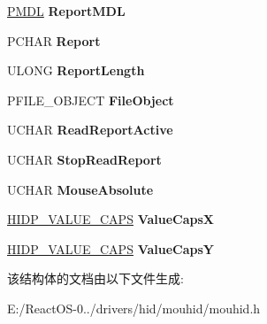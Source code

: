 \begin{DoxyCompactItemize}
\hyperlink{interfacevoid}{P\+M\+DL} {\bfseries Report\+M\+DL}
\item 
\mbox{\label{struct_m_o_u_h_i_d___d_e_v_i_c_e___e_x_t_e_n_s_i_o_n_ac40076c045a108e6a130cf6f31b1173a}} 
P\+C\+H\+AR {\bfseries Report}
\item 
\mbox{\label{struct_m_o_u_h_i_d___d_e_v_i_c_e___e_x_t_e_n_s_i_o_n_a8f4f640d72b6320b365d1a3a17cded89}} 
U\+L\+O\+NG {\bfseries Report\+Length}
\item 
\mbox{\label{struct_m_o_u_h_i_d___d_e_v_i_c_e___e_x_t_e_n_s_i_o_n_a71c0cf27dc09797198cd045c988089b4}} 
P\+F\+I\+L\+E\+\_\+\+O\+B\+J\+E\+CT {\bfseries File\+Object}
\item 
\mbox{\label{struct_m_o_u_h_i_d___d_e_v_i_c_e___e_x_t_e_n_s_i_o_n_a79579fc9f14d2bfc7ebc33baa6bd97d5}} 
U\+C\+H\+AR {\bfseries Read\+Report\+Active}
\item 
\mbox{\label{struct_m_o_u_h_i_d___d_e_v_i_c_e___e_x_t_e_n_s_i_o_n_a0f4694428b8cb55f714b73b707449614}} 
U\+C\+H\+AR {\bfseries Stop\+Read\+Report}
\item 
\mbox{\label{struct_m_o_u_h_i_d___d_e_v_i_c_e___e_x_t_e_n_s_i_o_n_a9330940775f0361a2afcbb9b6df9513b}} 
U\+C\+H\+AR {\bfseries Mouse\+Absolute}
\item 
\mbox{\label{struct_m_o_u_h_i_d___d_e_v_i_c_e___e_x_t_e_n_s_i_o_n_abb48b50974b4557772c09946fe73549f}} 
\hyperlink{struct___h_i_d_p___v_a_l_u_e___c_a_p_s}{H\+I\+D\+P\+\_\+\+V\+A\+L\+U\+E\+\_\+\+C\+A\+PS} {\bfseries Value\+CapsX}
\item 
\mbox{\label{struct_m_o_u_h_i_d___d_e_v_i_c_e___e_x_t_e_n_s_i_o_n_a3d7d5387737f6e87163e422b14245038}} 
\hyperlink{struct___h_i_d_p___v_a_l_u_e___c_a_p_s}{H\+I\+D\+P\+\_\+\+V\+A\+L\+U\+E\+\_\+\+C\+A\+PS} {\bfseries Value\+CapsY}
\end{DoxyCompactItemize}


该结构体的文档由以下文件生成\+:\begin{DoxyCompactItemize}
\item 
E\+:/\+React\+O\+S-\/0../drivers/hid/mouhid/mouhid.\+h\end{DoxyCompactItemize}
